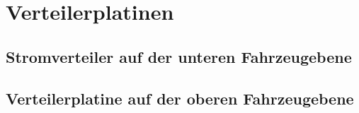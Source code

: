 

\pagestyle{fancy}
\rhead{\thepage} \chead{} 
\cfoot{}

\section{Verteilerplatinen}\label{Sec8}

\subsection{Stromverteiler auf der unteren Fahrzeugebene}\label{Sec8Sub1}

\subsection{Verteilerplatine auf der oberen Fahrzeugebene}\label{Sec8Sub2}

\newpage
